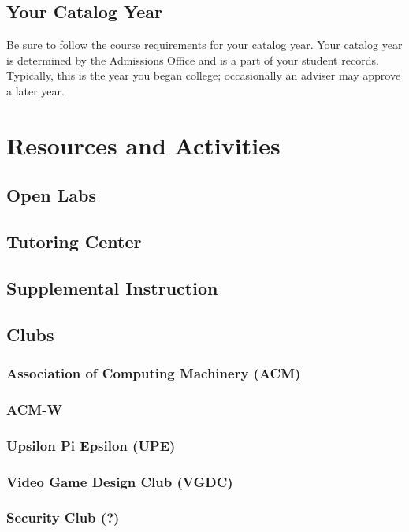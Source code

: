 \documentclass{book}
\begin{document}
\section{Your Catalog Year}
Be sure to follow the course requirements for your catalog year. Your catalog year is determined by the Admissions Office and is a part of your student records. Typically, this is the year you began college; occasionally an adviser may approve a later year.

\chapter{Resources and Activities}

\section{Open Labs}

\section{Tutoring Center}

\section{Supplemental Instruction}

\section{Clubs}
\subsection{Association of Computing Machinery (ACM)}

\subsection{ACM-W}

\subsection{Upsilon Pi Epsilon (UPE)}
\subsection{Video Game Design Club (VGDC)}
\subsection{Security Club (?)}
\end{document}
